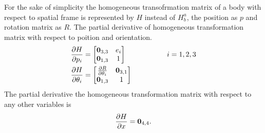 For the sake of simplicity the homogeneous transofrmation matrix of a body with respect to spatial frame is represented by $H$ instead of $H_b^a$, the position as $p$ and rotation matrix as $R$.
The partial derivative of homogeneous transformation matrix with respect to poition and orientation.
\begin{equation}
    \begin{split}
    \frac{\partial {H}}{\partial {p_i}} &= \begin{bmatrix} \textbf{0}_{3,3} &e_i \\ \textbf{0}_{1,3} &1 \end{bmatrix} \hspace{2cm} i={1,2,3} \\
    \frac{\partial {H}}{\partial {\theta_i}} &= \begin{bmatrix} \frac{\partial {R}}{\partial {\theta_i}} &\textbf{0}_{3,1} \\ \textbf{0}_{1,3} &1 \end{bmatrix} \\
    \end{split}
\end{equation}
The partial derivative the homogeneous transformation matrix with respect to any other variables is $$    \frac{\partial {H}}{\partial {x}} = \textbf{0}_{4,4}.$$

